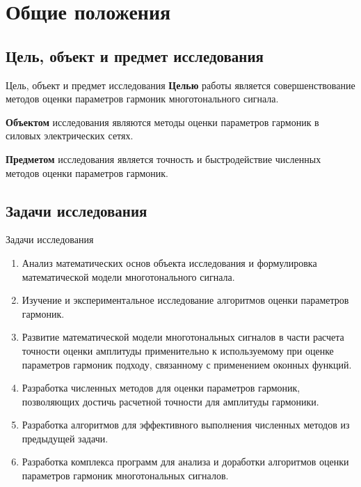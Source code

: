 \captionsetup[figure]{labelformat=simple, labelsep=period}
\section{Общие положения}

\subsection{Цель, объект и предмет исследования}
\begin{frame}{Цель, объект и предмет исследования}
	\textbf{Целью} работы является совершенствование методов оценки параметров гармоник многотонального сигнала. \vspace{1em}

	\textbf{Объектом} исследования являются методы оценки параметров гармоник в силовых электрических сетях. \vspace{1em}
	
	\textbf{Предметом} исследования является точность и быстродействие численных методов оценки параметров гармоник.	
\end{frame}

\subsection{Задачи исследования}
\begin{frame}{Задачи исследования}
	\begin{enumerate}
		\item Анализ математических основ объекта исследования и формулировка математической модели многотонального сигнала.
		\item Изучение и экспериментальное исследование алгоритмов оценки параметров гармоник.
		\item Развитие математической модели многотональных сигналов в части расчета точности оценки амплитуды применительно к используемому при оценке параметров гармоник подходу, связанному с применением оконных функций.
		\item Разработка численных методов для оценки параметров гармоник, позволяющих достичь расчетной точности для амплитуды гармоники.
		\item Разработка алгоритмов для эффективного выполнения численных методов из предыдущей задачи.
		\item Разработка комплекса программ для анализа и доработки алгоритмов оценки параметров гармоник многотональных сигналов.
	\end{enumerate}
\end{frame}

